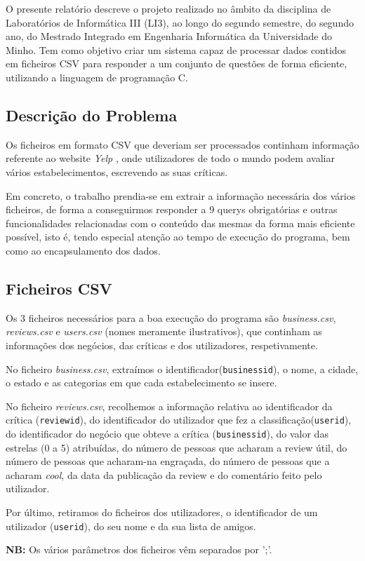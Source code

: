 \documentclass[a4paper]{article}
\begin{document}
O presente relatório descreve o projeto realizado no âmbito da disciplina de
Laboratórios de Informática III (LI3), ao longo do segundo semestre,
do segundo ano, do Mestrado Integrado em Engenharia Informática da Universidade do Minho.
Tem como objetivo criar um sistema capaz de processar dados contidos em ficheiros CSV para 
responder a um conjunto de questões de forma eficiente, utilizando a linguagem de programação C.


\subsection{Descrição do Problema}
\label{sec:problema}

Os ficheiros em formato CSV que deveriam ser processados continham informação referente ao
website {\textit{Yelp}} \cite{yelp}, onde utilizadores
de todo o mundo podem avaliar vários estabelecimentos, escrevendo as suas críticas.

Em concreto, o trabalho prendia-se em extrair a informação necessária dos vários
ficheiros, de forma a conseguirmos responder a 9 querys obrigatórias e outras funcionalidades relacionadas com
o conteúdo das mesmas da forma mais eficiente possível, isto é, tendo especial
atenção ao tempo de execução do programa, bem como ao encapsulamento dos dados.

\subsection{Ficheiros CSV}
\label{sec:CSV}

Os 3 ficheiros necessários para a boa execução do programa são \textit{business.csv}, \textit{reviews.csv} e \textit{users.csv} (nomes
meramente ilustrativos), que continham as informações dos negócios, das críticas e dos utilizadores, respetivamente. \par
No ficheiro \textit{business.csv}, extraímos o identificador(\texttt{business\textunderscore id}), o nome, a cidade, o estado e as categorias em que cada estabelecimento se insere. \par
No ficheiro \textit{reviews.csv}, recolhemos a informação relativa ao identificador da crítica (\texttt{review\textunderscore id}), do identificador
do utilizador que fez a classificação(\texttt{user\textunderscore id}), do identificador do negócio que obteve 
a crítica (\texttt{business\textunderscore id}),
do valor das estrelas (0 a 5) atribuídas, do número de pessoas que 
acharam a review útil, do número de pessoas que acharam-na engraçada, do número de pessoas que a acharam 
\textit{cool}, 
da data da publicação da review e do comentário feito pelo utilizador. \par
Por último, retiramos do ficheiros dos utilizadores, o identificador de um utilizador (\texttt{user\textunderscore id}), do seu nome e da sua lista de amigos. \par
      \vspace{0.25cm}
\textbf{NB:} Os vários parâmetros dos ficheiros vêm separados por ';'.
\end{document}
